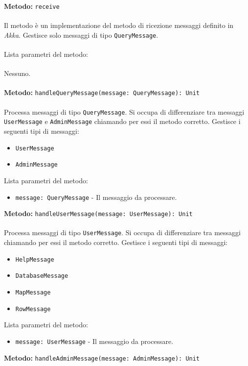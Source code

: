 \documentclass[a4paper]{article}
\begin{document}
		\textbf{Metodo: }\texttt{receive}
			\\ \\
			Il metodo è un implementazione del metodo di ricezione messaggi definito in \emph{Akka}. Gestisce solo messaggi di tipo \texttt{QueryMessage}.
			\\ \\
			Lista parametri del metodo:
			\\ \\
			Nessuno.
			\\ \\
		\textbf{Metodo: }\texttt{handleQueryMessage(message: QueryMessage): Unit}
			\\ \\
			Processa messaggi di tipo \texttt{QueryMessage}. Si occupa di differenziare tra messaggi \texttt{UserMessage} e \texttt{AdminMessage} chiamando per essi il metodo corretto.
			Gestisce i seguenti tipi di messaggi:
			\begin{itemize}
				\item \texttt{UserMessage}
				\item \texttt{AdminMessage}
			\end{itemize}
			Lista parametri del metodo:
			\begin{itemize}
				\item \texttt{message: QueryMessage} - Il messaggio da processare.
			\end{itemize}
		\textbf{Metodo: }\texttt{handleUserMessage(message: UserMessage): Unit}
			\\ \\
			Processa messaggi di tipo \texttt{UserMessage}. Si occupa di differenziare tra messaggi chiamando per essi il metodo corretto.
			Gestisce i seguenti tipi di messaggi:
			\begin{itemize}
				\item \texttt{HelpMessage}
				\item \texttt{DatabaseMessage}
				\item \texttt{MapMessage}
				\item \texttt{RowMessage}
			\end{itemize}
			Lista parametri del metodo:
			\begin{itemize}
				\item \texttt{message: UserMessage} - Il messaggio da processare.
			\end{itemize}
		\textbf{Metodo: }\texttt{handleAdminMessage(message: AdminMessage): Unit}
			\\ \\
\end{document}
